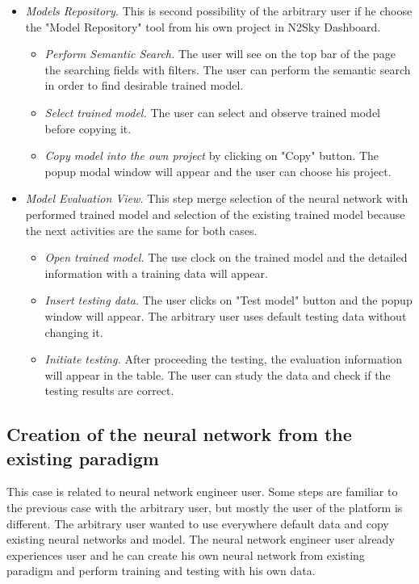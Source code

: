 \begin{itemize}
\item \emph{Models Repository.} This is second possibility of the arbitrary user if he choose the "Model Repository" tool from his own project in N2Sky Dashboard.
\begin{itemize}
\item \emph{Perform Semantic Search.} The user will see on the top bar of the page the searching fields with filters. The user can perform the semantic search in order to find desirable trained model.
\item \emph{Select trained model.} The user can select and observe trained model before copying it.
\item \emph{Copy model into the own project} by clicking on "Copy" button. The popup modal window will appear and the user can choose his project.
\end{itemize}

\item \emph{Model Evaluation View.} This step merge selection of the neural network with performed trained model and selection of the existing trained model because the next activities are the same for both cases.
\begin{itemize}
\item \emph{Open trained model.} The use clock on the trained model and the detailed information with a training data will appear.
\item \emph{Insert testing data.} The user clicks on "Test model" button and the popup window will appear. The arbitrary user uses default testing data without changing it.
\item \emph{Initiate testing.} After proceeding the testing, the evaluation information will appear in the table. The user can study the data and check if the testing results are correct.
\end{itemize}


\end{itemize}



\subsection{Creation of the neural network from the existing paradigm}\label{Creation of the neural network from the existing paradigm}

This case is related to neural network engineer user. Some steps are familiar to the previous case with the arbitrary user, but mostly the user of the platform is different. The arbitrary user wanted to use everywhere default data and copy existing neural networks and model. The neural network engineer user already experiences user and he can create his own neural network from existing paradigm and perform training and testing with his own data.


